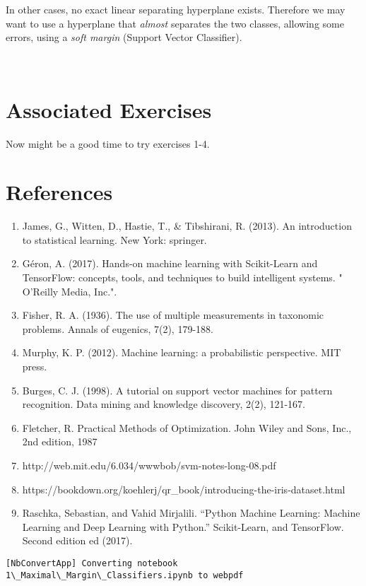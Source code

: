 \documentclass[11pt]{article}
\providecommand{\tightlist}{%
      \setlength{\itemsep}{0pt}\setlength{\parskip}{0pt}}
\begin{document}
    In other cases, no exact linear separating hyperplane exists. Therefore
we may want to use a hyperplane that \emph{almost} separates the two
classes, allowing some errors, using a \emph{soft margin} (Support
Vector Classifier).

    \begin{center}
    \end{center}
    { \hspace*{\fill} \\}
    
    \hypertarget{associated-exercises}{%
\section{Associated Exercises}\label{associated-exercises}}

Now might be a good time to try exercises 1-4.

\hypertarget{references}{%
\section{References}\label{references}}

\begin{enumerate}
\def\labelenumi{\arabic{enumi}.}
\tightlist
\item
  James, G., Witten, D., Hastie, T., \& Tibshirani, R. (2013). An
  introduction to statistical learning. New York: springer.
\item
  Géron, A. (2017). Hands-on machine learning with Scikit-Learn and
  TensorFlow: concepts, tools, and techniques to build intelligent
  systems. " O'Reilly Media, Inc.".
\item
  Fisher, R. A. (1936). The use of multiple measurements in taxonomic
  problems. Annals of eugenics, 7(2), 179-188.
\item
  Murphy, K. P. (2012). Machine learning: a probabilistic perspective.
  MIT press.
\item
  Burges, C. J. (1998). A tutorial on support vector machines for
  pattern recognition. Data mining and knowledge discovery, 2(2),
  121-167.
\item
  Fletcher, R. Practical Methods of Optimization. John Wiley and Sons,
  Inc., 2nd edition, 1987
\item
  http://web.mit.edu/6.034/wwwbob/svm-notes-long-08.pdf
\item
  https://bookdown.org/koehlerj/qr\_book/introducing-the-iris-dataset.html
\item
  Raschka, Sebastian, and Vahid Mirjalili. ``Python Machine Learning:
  Machine Learning and Deep Learning with Python.'' Scikit-Learn, and
  TensorFlow. Second edition ed (2017).
\end{enumerate}

    \begin{Verbatim}[commandchars=\\\{\}]
[NbConvertApp] Converting notebook 1\_Maximal\_Margin\_Classifiers.ipynb to webpdf
    \end{Verbatim}


    
    
    
\end{document}
